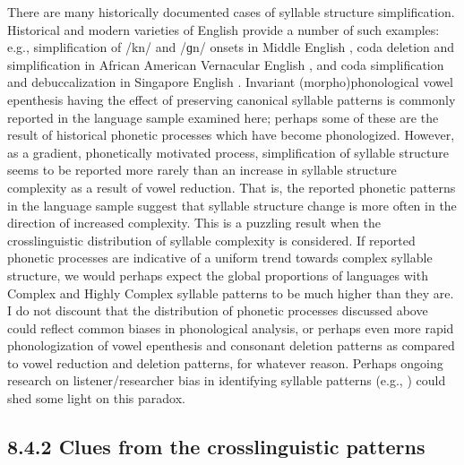   There are many historically documented cases of syllable structure simplification. Historical and modern varieties of English provide a number of such examples: e.g., simplification of /kn/ and /ɡn/ onsets in Middle English \citep{Minkova2003}, coda deletion and simplification in African American Vernacular English \citep{Rickford1999}, and coda simplification and debuccalization in Singapore English \citep{Deterding2007}. Invariant (morpho)phonological vowel epenthesis having the effect of preserving canonical syllable patterns is commonly reported in the language sample examined here; perhaps some of these are the result of historical phonetic processes which have become phonologized. However, as a gradient, phonetically motivated process, simplification of syllable structure seems to be reported more rarely than an increase in syllable structure complexity as a result of vowel reduction. That is, the reported phonetic patterns in the language sample suggest that syllable structure change is more often in the direction of increased complexity. This is a puzzling result when the crosslinguistic distribution of syllable complexity is considered. If reported phonetic processes are indicative of a uniform trend towards complex syllable structure, we would perhaps expect the global proportions of languages with Complex and Highly Complex syllable patterns to be much higher than they are. I do not discount that the distribution of phonetic processes discussed above could reflect common biases in phonological analysis, or perhaps even more rapid phonologization of vowel epenthesis and consonant deletion patterns as compared to vowel reduction and deletion patterns, for whatever reason. Perhaps ongoing research on listener/researcher bias in identifying syllable patterns (e.g., \citealt{KwonEtAl2017}) could shed some light on this paradox.

\subsection{8.4.2 Clues from the crosslinguistic patterns}

